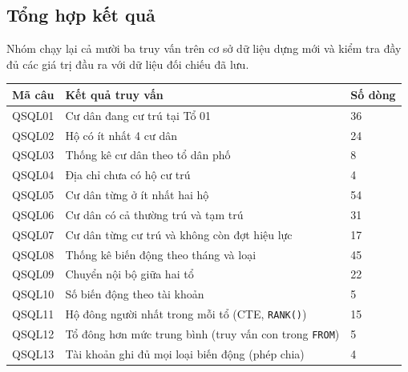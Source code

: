 \noindent\begin{minipage}{\linewidth}
\subsection*{Tổng hợp kết quả}

Nhóm chạy lại cả mười ba truy vấn trên cơ sở dữ liệu dựng mới và kiểm tra đầy đủ các giá trị đầu ra với dữ liệu đối chiếu đã lưu.

\par\medskip
{
\centering
\fontsize{11pt}{14pt}\selectfont
\renewcommand{\arraystretch}{1.15}
\begin{tabularx}{\textwidth}{|P{1.7cm}|Y|P{1.8cm}|}
\hline
\textbf{Mã câu} & \textbf{Kết quả truy vấn} & \textbf{Số dòng} \\
\hline
QSQL01 & Cư dân đang cư trú tại Tổ 01 & 36 \\ \hline
QSQL02 & Hộ có ít nhất 4 cư dân & 24 \\ \hline
QSQL03 & Thống kê cư dân theo tổ dân phố & 8 \\ \hline
QSQL04 & Địa chỉ chưa có hộ cư trú & 4 \\ \hline
QSQL05 & Cư dân từng ở ít nhất hai hộ & 54 \\ \hline
QSQL06 & Cư dân có cả thường trú và tạm trú & 31 \\ \hline
QSQL07 & Cư dân từng cư trú và không còn đợt hiệu lực & 17 \\ \hline
QSQL08 & Thống kê biến động theo tháng và loại & 45 \\ \hline
QSQL09 & Chuyển nội bộ giữa hai tổ & 22 \\ \hline
QSQL10 & Số biến động theo tài khoản & 5 \\ \hline
QSQL11 & Hộ đông người nhất trong mỗi tổ (CTE, \texttt{RANK()}) & 15 \\ \hline
QSQL12 & Tổ đông hơn mức trung bình (truy vấn con trong \texttt{FROM}) & 5 \\ \hline
QSQL13 & Tài khoản ghi đủ mọi loại biến động (phép chia) & 4 \\ \hline
\end{tabularx}
\label{tab:ketquasql}
}
\end{minipage}\par\medskip
